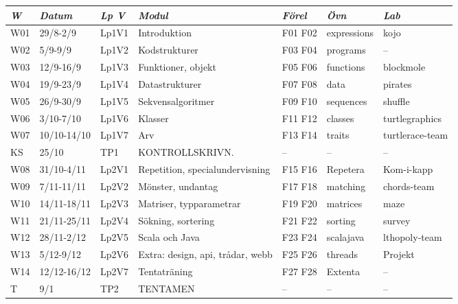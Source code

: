 \begin{tabular}{l|l|l|l|l|l|l}
\textit{W} & \textit{Datum} & \textit{Lp V} & \textit{Modul} & \textit{Förel} & \textit{Övn} & \textit{Lab} \\ \hline \hline
W01 & 29/8-2/9 & Lp1V1 & Introduktion & F01 F02 & expressions & kojo \\
W02 & 5/9-9/9 & Lp1V2 & Kodstrukturer & F03 F04 & programs & -- \\
W03 & 12/9-16/9 & Lp1V3 & Funktioner, objekt & F05 F06 & functions & blockmole \\
W04 & 19/9-23/9 & Lp1V4 & Datastrukturer & F07 F08 & data & pirates \\
W05 & 26/9-30/9 & Lp1V5 & Sekvensalgoritmer & F09 F10 & sequences & shuffle \\
W06 & 3/10-7/10 & Lp1V6 & Klasser & F11 F12 & classes & turtlegraphics \\
W07 & 10/10-14/10 & Lp1V7 & Arv & F13 F14 & traits & turtlerace-team \\
KS & 25/10 & TP1 & KONTROLLSKRIVN. & -- & -- & -- \\
W08 & 31/10-4/11 & Lp2V1 & Repetition, specialundervisning & F15 F16 & Repetera & Kom-i-kapp \\
W09 & 7/11-11/11 & Lp2V2 & Mönster, undantag & F17 F18 & matching & chords-team \\
W10 & 14/11-18/11 & Lp2V3 & Matriser, typparametrar & F19 F20 & matrices & maze \\
W11 & 21/11-25/11 & Lp2V4 & Sökning, sortering & F21 F22 & sorting & survey \\
W12 & 28/11-2/12 & Lp2V5 & Scala och Java & F23 F24 & scalajava & lthopoly-team \\
W13 & 5/12-9/12 & Lp2V6 & Extra: design, api, trådar, webb & F25 F26 & threads & Projekt \\
W14 & 12/12-16/12 & Lp2V7 & Tentaträning & F27 F28 & Extenta & -- \\
T & 9/1 & TP2 & TENTAMEN & -- & -- & -- \\
\end{tabular}
